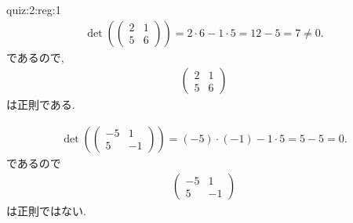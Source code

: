 \begin{answerof}{quiz:2:reg:1}
  \begin{align*}
    \det(\begin{pmatrix}
      2&1\\5&6
    \end{pmatrix})=2\cdot 6 -1\cdot 5=12-5=7\neq 0.
  \end{align*}
  であるので,
  \begin{align*}
    \begin{pmatrix}
      2&1\\5&6
    \end{pmatrix}
  \end{align*}
  は正則である.

  
  \begin{align*}
    \det(\begin{pmatrix}
      -5&1\\5&-1
    \end{pmatrix})=(-5)\cdot(-1) -1\cdot 5=5-5=0.
  \end{align*}
  であるので
  \begin{align*}
    \begin{pmatrix}
      -5&1\\5&-1
    \end{pmatrix}
  \end{align*}
  は正則ではない.
\end{answerof}
